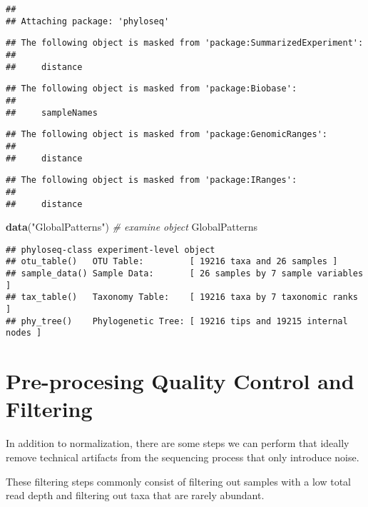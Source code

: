 \documentclass[
]{book}
\newenvironment{Shaded}{\begin{snugshade}}{\end{snugshade}}
\newcommand{\CommentTok}[1]{\textcolor[rgb]{0.56,0.35,0.01}{\textit{#1}}}
\newcommand{\KeywordTok}[1]{\textcolor[rgb]{0.13,0.29,0.53}{\textbf{#1}}}
\newcommand{\NormalTok}[1]{#1}
\newcommand{\StringTok}[1]{\textcolor[rgb]{0.31,0.60,0.02}{#1}}
\begin{document}
\begin{verbatim}
## 
## Attaching package: 'phyloseq'
\end{verbatim}

\begin{verbatim}
## The following object is masked from 'package:SummarizedExperiment':
## 
##     distance
\end{verbatim}

\begin{verbatim}
## The following object is masked from 'package:Biobase':
## 
##     sampleNames
\end{verbatim}

\begin{verbatim}
## The following object is masked from 'package:GenomicRanges':
## 
##     distance
\end{verbatim}

\begin{verbatim}
## The following object is masked from 'package:IRanges':
## 
##     distance
\end{verbatim}

\begin{Shaded}
\begin{Highlighting}[]
\KeywordTok{data}\NormalTok{(}\StringTok{"GlobalPatterns"}\NormalTok{)}
\CommentTok{\# examine object }
\NormalTok{GlobalPatterns}
\end{Highlighting}
\end{Shaded}

\begin{verbatim}
## phyloseq-class experiment-level object
## otu_table()   OTU Table:         [ 19216 taxa and 26 samples ]
## sample_data() Sample Data:       [ 26 samples by 7 sample variables ]
## tax_table()   Taxonomy Table:    [ 19216 taxa by 7 taxonomic ranks ]
## phy_tree()    Phylogenetic Tree: [ 19216 tips and 19215 internal nodes ]
\end{verbatim}

\hypertarget{pre-procesing-quality-control-and-filtering}{%
\section{Pre-procesing Quality Control and Filtering}\label{pre-procesing-quality-control-and-filtering}}

In addition to normalization, there are some steps we can perform that ideally remove technical artifacts from the sequencing process that only introduce noise.

These filtering steps commonly consist of filtering out samples with a low total read depth and filtering out taxa that are rarely abundant.
\end{document}

